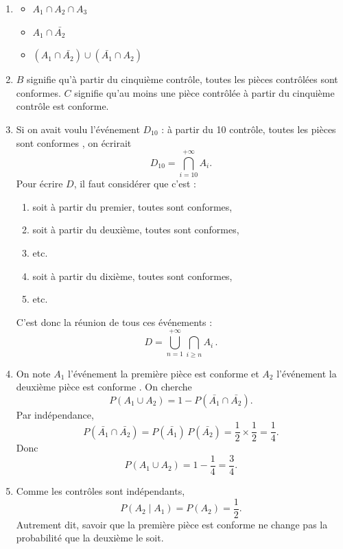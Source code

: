 \begin{Corrige}
\begin{enumerate}
    \item
    \begin{itemize}
        \item $A_1 \cap A_2 \cap A_3$
        \item $A_1 \cap \bar{A_2}$
        \item $(A_1 \cap \bar{A_2}) \cup (\bar{A_1} \cap A_2)$
    \end{itemize}

    \item $B$ signifie qu'à partir du cinquième contrôle, toutes les pièces contrôlées sont conformes. $C$ signifie qu'au moins une pièce contrôlée à partir du cinquième contrôle est conforme.

    \item Si on avait voulu l'événement $D_{10}$ : \og à partir du 10\ieme{} contrôle, toutes les pièces sont conformes \fg, on écrirait
    $$
    D_{10}=\bigcap_{i=10}^{+\infty} A_i.
    $$
    Pour écrire $D$, il faut considérer que c'est :
    \begin{enumerate}
        \item soit à partir du premier, toutes sont conformes,
        \item soit à partir du deuxième, toutes sont conformes,
        \item etc.
        \item soit à partir du dixième, toutes sont conformes,
        \item etc.
    \end{enumerate}
    C'est donc la réunion de tous ces événements :
    $$
    D=\bigcup_{n=1}^{+\infty} \bigcap_{i \geq n} A_i\,.
    $$

    \item On note $A_1$ l'événement \og la première pièce est conforme \fg{} et $A_2$ l'événement \og la deuxième pièce est conforme \fg. On cherche
    $$
    P(A_1 \cup A_2) = 1 - P(\bar{A_1} \cap \bar{A_2}).
    $$
    Par indépendance,
    $$
    P(\bar{A_1} \cap \bar{A_2}) = P(\bar{A_1}) \, P(\bar{A_2}) = \frac{1}{2} \times \frac{1}{2} = \frac{1}{4}.
    $$
    Donc
    $$
    P(A_1 \cup A_2) = 1 - \frac{1}{4} = \frac{3}{4}.
    $$

    \item Comme les contrôles sont indépendants,
    $$
    P(A_2 \mid A_1) = P(A_2) = \frac{1}{2}.
    $$
    Autrement dit, savoir que la première pièce est conforme ne change pas la probabilité que la deuxième le soit.


\end{enumerate}
\end{Corrige}
